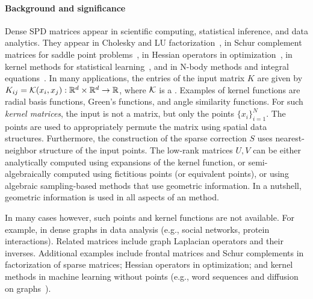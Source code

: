 \paragraph{\textbf{Background and significance}}
Dense SPD matrices appear in scientific computing, statistical inference, and data analytics. They appear in Cholesky and LU factorization~\cite{grasedyck-kriemann-leborne08}, in Schur complement matrices for saddle point problems~\cite{benzi-golub-liesen05}, in Hessian operators in optimization~\cite{biegler-ghattas01}, in kernel methods for statistical learning~\cite{hofmann-scholkopf-smola08,gray-moore01}, and in N-body methods and integral equations~\cite{greengard94,hackbusch15}. In many applications, the entries of the input matrix $K$ are given by $K_{ij} = \mathcal{K}(x_i, x_j):\mathbb{R}^d\times\mathbb{R}^d\rightarrow \mathbb{R}$, where $\mathcal{K}$ is a . Examples of kernel functions are radial basis functions, Green's functions, and angle similarity functions. For such \emph{kernel matrices}, the input is not a matrix, but only the points $\{x_i\}_{i=1}^N$. The  points are used to appropriately permute the matrix using spatial data structures. Furthermore, the construction of the sparse correction $S$ uses  nearest-neighbor structure of the input points. The low-rank matrices $U,V$ can be either analytically computed using expansions of the kernel function, or semi-algebraically computed using fictitious points (or equivalent points), or using algebraic sampling-based methods that use geometric information. In a nutshell, geometric information is used in all aspects of an \hmatrix{} method.

In many cases however, such points and kernel functions are not available. For example, in dense graphs in data analysis (e.g., social networks, protein interactions). Related matrices include graph Laplacian operators and their inverses. Additional examples include frontal matrices and Schur complements in factorization of sparse matrices; Hessian operators in optimization; and kernel methods in machine learning without points (e.g., word sequences and diffusion on graphs~\cite{cancedda-e03,kondor-lafferty02}).

